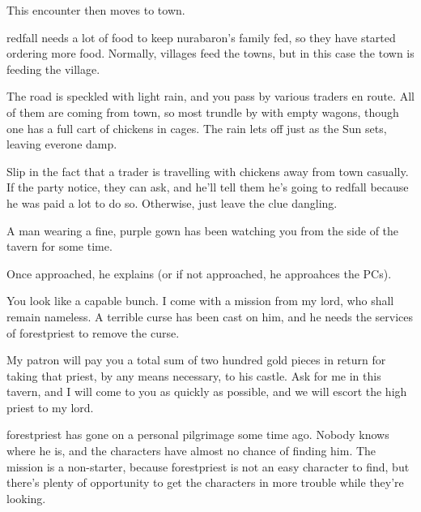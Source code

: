 \begin{multicols}{2}
This encounter then moves to town.


\Gls{redfall} needs a lot of food to keep \gls{nurabaron}'s family fed, so they have started ordering more food.
Normally, villages feed the towns, but in this case the town is feeding the village.

\begin{boxtext}

	The road is speckled with light rain, and you pass by various traders en route.
	All of them are coming from town, so most trundle by with empty wagons, though one has a full cart of chickens in cages.
	The rain lets off just as the Sun sets, leaving everone damp.

\end{boxtext}

Slip in the fact that a trader is travelling with chickens away from town casually.
If the party notice, they can ask, and he'll tell them he's going to \gls{redfall} because he was paid a lot to do so.
Otherwise, just leave the clue dangling.


\begin{boxtext}

	A man wearing a fine, purple gown has been watching you from the side of the tavern for some time.

\end{boxtext}

Once approached, he explains (or if not approached, he approahces the PCs).

\begin{speechtext}

	You look like a capable bunch.
	I come with a mission from my lord, who shall remain nameless.
	A terrible curse has been cast on him, and he needs the services of \gls{forestpriest} to remove the curse.

	My patron will pay you a total sum of two hundred gold pieces in return for taking that priest, by any means necessary, to his castle.
	Ask for me in this tavern, and I will come to you as quickly as possible, and we will escort the high priest to my lord.

\end{speechtext}

\Gls{forestpriest} has gone on a personal pilgrimage some time ago.
Nobody knows where he is, and the characters have almost no chance of finding him.
The mission is a non-starter, because \gls{forestpriest} is not an easy character to find, but there's plenty of opportunity to get the characters in more trouble while they're looking.


\end{multicols}
